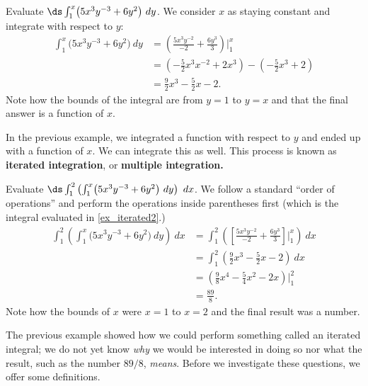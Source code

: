 \begin{example}\label{ex_iterated2}
Evaluate $\ds \int_1^x\bigl(5x^3y^{-3}+6y^2\bigr)\ dy$.
\solution
We consider $x$ as staying constant and integrate with respect to $y$:
\begin{align*}
\int_1^x\bigl(5x^3y^{-3}+6y^2\bigr)\ dy & = \left(\frac{5x^3y^{-2}}{-2}+\frac{6y^3}{3}\right)\Bigg|_1^x \\
						&= \left(-\frac52x^3x^{-2}+2x^3\right) - \left(-\frac52x^3+2\right) \\
						&= \frac92x^3-\frac52x-2.
\end{align*}
Note how the bounds of the integral are from $y=1$ to $y=x$ and that the final answer is a function of $x$.
\end{example}

In the previous example, we integrated a function with respect to $y$ and ended up with a function of $x$. We can integrate this as well. This process is known as \textbf{iterated integration}, or \textbf{multiple integration.}


\begin{example}\label{ex_iterated3}
Evaluate $\ds \int_1^2\left(\int_1^x\bigl(5x^3y^{-3}+6y^2\bigr)\ dy\right)\ dx$.
\solution
We follow a standard ``order of operations'' and perform the operations inside parentheses first (which is the integral evaluated in \autoref{ex_iterated2}.)
\begin{align*}
\int_1^2\left(\int_1^x\bigl(5x^3y^{-3}+6y^2\bigr)\ dy\right)\ dx &= \int_1^2 \left(\left[\frac{5x^3y^{-2}}{-2}+\frac{6y^3}{3}\right]\Bigg|_1^x\right)\ dx \\
			&= \int_1^2 \left(\frac92x^3-\frac52x-2\right)\ dx \\
			&= \left(\frac98x^4-\frac54x^2-2x\right)\Bigg|_1^2\\
			&= \frac{89}8.
\end{align*}
Note how the bounds of $x$ were $x=1$ to $x=2$ and the final result was a number.
\end{example}

The previous example showed how we could perform something called an iterated integral; we do not yet know \emph{why} we would be interested in doing so nor what the result, such as the number $89/8$, \emph{means}. Before we investigate these questions, we offer some definitions.

